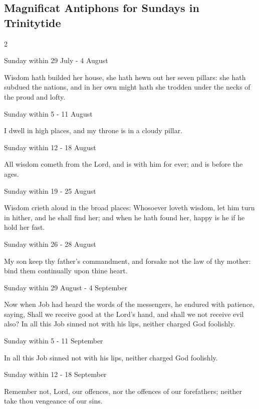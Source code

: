 \subsection{Magnificat Antiphons for Sundays in Trinitytide}
\fancyhead[RE,LO]{}
\begin{multicols}{2}
\begin{inhead}
Sunday within 29 July - 4 August
\end{inhead}\par\noindent
Wisdom hath builded her house, {\dag} she hath hewn out her seven pillars: she hath subdued the nations, and in her own might hath she trodden under the necks of the proud and lofty.

\begin{inhead}
Sunday within 5 - 11 August
\end{inhead}\par\noindent
I dwell {\dag} in high places, and my throne is in a cloudy pillar.
\begin{inhead}
Sunday within 12 - 18 August
\end{inhead}\par\noindent
All wisdom {\dag} cometh from the Lord, and is with him for ever; and is before the ages.

\begin{inhead}
Sunday within 19 - 25 August
\end{inhead}\par\noindent
Wisdom crieth {\dag} aloud in the broad places: Whosoever loveth wisdom, let him turn in hither, and he shall find her; and when he hath found her, happy is he if he hold her fast.
\begin{inhead}
Sunday within 26 - 28 August
\end{inhead}\par\noindent
My son {\dag} keep thy father's commandment, and forsake not the law of thy mother: bind them continually upon thine heart.
\begin{inhead}
Sunday within 29 August - 4 September
\end{inhead}\par\noindent
Now when Job had heard {\dag} the words of the messengers, he endured with patience, saying, Shall we receive good at the Lord's hand, and shall we not receive evil also? In all this Job sinned not with his lips, neither charged God foolishly.
\begin{inhead}
Sunday within 5 - 11 September
\end{inhead}\par\noindent
In all this {\dag} Job sinned not with his lips, neither charged God foolishly.
\begin{inhead}
Sunday within 12 - 18 September
\end{inhead}\par\noindent
Remember not, {\dag} Lord, our offences, nor the offences of our forefathers; neither take thou vengeance of our sins.


\end{multicols}
